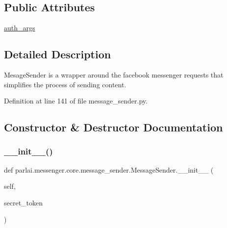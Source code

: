 \subsection*{Public Attributes}
\begin{DoxyCompactItemize}
\item 
\hyperlink{classparlai_1_1messenger_1_1core_1_1message__sender_1_1MessageSender_a059a9d303e6db34e6a7bb1660b1a32d8}{auth\+\_\+args}
\end{DoxyCompactItemize}


\subsection{Detailed Description}
\begin{DoxyVerb}MesageSender is a wrapper around the facebook messenger requests that
simplifies the process of sending content.
\end{DoxyVerb}
 

Definition at line 141 of file message\+\_\+sender.\+py.



\subsection{Constructor \& Destructor Documentation}
\mbox{\label{classparlai_1_1messenger_1_1core_1_1message__sender_1_1MessageSender_ac39036ce02318777c7c398cffa28e4ff}} 
\subsubsection{\texorpdfstring{\+\_\+\+\_\+init\+\_\+\+\_\+()}{\_\_init\_\_()}}
{\footnotesize\ttfamily def parlai.\+messenger.\+core.\+message\+\_\+sender.\+Message\+Sender.\+\_\+\+\_\+init\+\_\+\+\_\+ (\begin{DoxyParamCaption}\item[{}]{self,  }\item[{}]{secret\+\_\+token }\end{DoxyParamCaption})}

